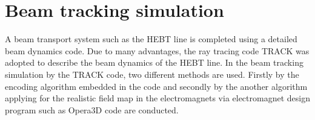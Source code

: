 \documentclass[jkps,preprint,fleqn,showpacs,showkeys,10pt,twocolumn]{revtex4}
\begin{document}
\section{Beam tracking simulation}
\label{sec:TRACK}
A beam transport system such as the HEBT line is completed using a detailed beam dynamics code.
Due to many advantages, the ray tracing code TRACK\cite{TRACK} was adopted to describe the beam dynamics of the HEBT line.
In the beam tracking simulation by the TRACK code, two different methods are used. Firstly by the encoding algorithm embedded in the code
and secondly by the another algorithm applying for the realistic field map in the electromagnets
via electromagnet design program such as Opera3D code are conducted.
\end{document}
